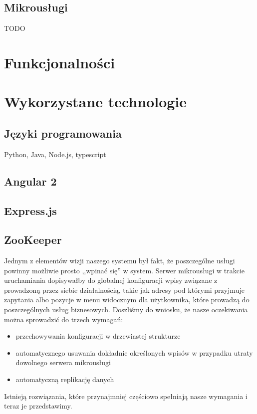 \documentclass[licencjacka]{pracamgr}
\begin{document}
\section{Mikrousługi}
TODO

\chapter{Funkcjonalności}\label{r:fun}


\chapter{Wykorzystane technologie}\label{r:tech}

\section{Języki programowania}
Python, Java, Node.js, typescript

\section{Angular 2}

\section{Express.js}

\section{ZooKeeper}

Jednym z elementów wizji naszego systemu był fakt, że poszczególne usługi
powinny możliwie prosto ,,wpinać się'' w system. Serwer mikrousługi w trakcie
uruchamiania dopisywałby do globalnej konfiguracji wpisy związane z prowadzoną
przez siebie działalnością, takie jak adresy pod którymi przyjmuje zapytania
albo pozycje w menu widocznym dla użytkownika, które prowadzą do poszczególnych
usług biznesowych. Doszliśmy do wniosku, że nasze oczekiwania można sprowadzić
do trzech wymagań:
\begin{itemize}
	\item przechowywania konfiguracji w drzewiastej strukturze
	\item automatycznego usuwania dokładnie określonych wpisów w przypadku
	utraty dowolnego serwera mikrousługi
	\item automatyczną replikację danych
\end{itemize}
Istnieją rozwiązania, które przynajmniej częściowo spełniają nasze wymagania i
teraz je przedstawimy.
\end{document}
